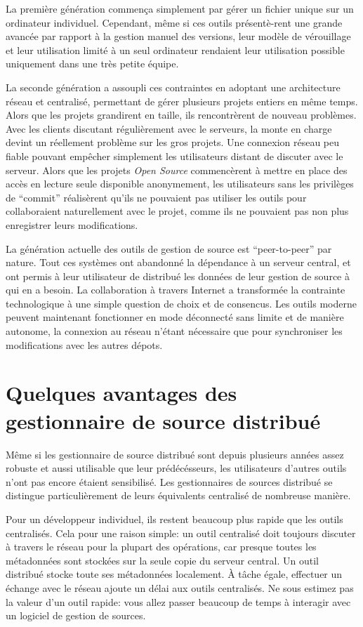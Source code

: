 La première génération commença simplement par gérer un fichier unique sur un ordinateur individuel. Cependant, même si ces outils présentè-rent une grande avancée par rapport à la gestion manuel des versions, leur modèle de vérouillage et leur utilisation limité à un seul ordinateur rendaient leur utilisation possible uniquement dans une très petite équipe. 

La seconde génération a assoupli ces contraintes en adoptant une architecture réseau et centralisé, permettant de gérer plusieurs projets entiers en même temps. Alors que les projets grandirent en taille, ils rencontrèrent de nouveau problèmes. Avec les clients discutant régulièrement avec le serveurs, la monte en charge devint un réellement problème sur les gros projets. Une connexion réseau peu fiable pouvant empêcher simplement les utilisateurs distant de discuter avec le serveur. Alors que les projets \textit{Open Source} commencèrent à mettre en place des accès en lecture seule disponible anonymement, les utilisateurs sans les privilèges de ``commit'' réalisèrent qu'ils ne pouvaient pas utiliser les outils pour collaboraient naturellement avec le projet, comme ils ne pouvaient pas non plus enregistrer leurs modifications.

La génération actuelle des outils de gestion de source est ``peer-to-peer'' par nature. Tout ces systèmes ont abandonné la dépendance à un serveur central, et ont permis à leur utilisateur de distribué les données de leur gestion de source à qui en a besoin. La collaboration à travers Internet a transformée la contrainte technologique à une simple question de choix et de consencus. Les outils moderne peuvent maintenant fonctionner en mode déconnecté sans limite et de manière autonome, la connexion au réseau n'étant nécessaire que pour synchroniser les modifications avec les autres dépots.

\section{Quelques avantages des gestionnaire de source distribué}

Même si les gestionnaire de source distribué sont depuis plusieurs années
assez robuste et aussi utilisable que leur prédécésseurs, les utilisateurs
d'autres outils n'ont pas encore étaient sensibilisé. Les gestionnaires
de sources distribué se distingue particulièrement de leurs équivalents
centralisé de nombreuse manière.

Pour un développeur individuel, ils restent beaucoup plus rapide que les
outils centralisés. Cela pour une raison simple: un outil centralisé doit
toujours discuter à travers le réseau pour la plupart des opérations, car
presque toutes les métadonnées sont stockées sur la seule copie du serveur
central. Un outil distribué stocke toute ses métadonnées localement. À tâche
égale, effectuer un échange avec le réseau ajoute un délai aux outils 
centralisés. Ne sous estimez pas la valeur d'un outil rapide: vous allez
passer beaucoup de temps à interagir avec un logiciel de gestion de sources.

